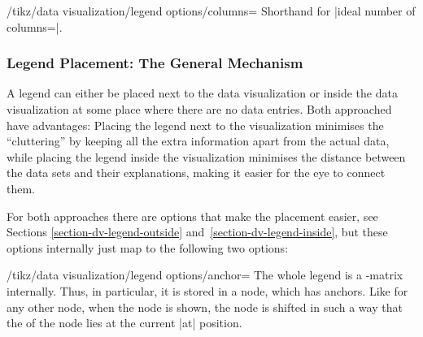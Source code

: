 \begin{key}{/tikz/data visualization/legend options/columns=}
    Shorthand for |ideal number of columns=|.
\end{key}


\subsubsection{Legend Placement: The General Mechanism}

A legend can either be placed next to the data visualization or inside the data
visualization at some place where there are no data entries. Both approached
have advantages: Placing the legend next to the visualization minimises the
``cluttering'' by keeping all the extra information apart from the actual data,
while placing the legend inside the visualization minimises the distance
between the data sets and their explanations, making it easier for the eye to
connect them.

For both approaches there are options that make the placement easier, see
Sections \ref{section-dv-legend-outside} and~\ref{section-dv-legend-inside},
but these options internally just map to the following two options:

\begin{key}{/tikz/data visualization/legend options/anchor=}
    The whole legend is a \tikzname-matrix internally. Thus, in particular, it
    is stored in a node, which has anchors. Like for any other node, when the
    node is shown, the node is shifted in such a way that the  of
    the node lies at the current |at| position.
\end{key}

